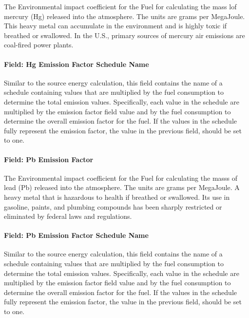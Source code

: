 The Environmental impact coefficient for the Fuel for calculating the mass lof mercury (Hg) released into the atmosphere. The units are grams per MegaJoule. This heavy metal can accumulate in the environment and is highly toxic if breathed or swallowed. In the U.S., primary sources of mercury air emissions are coal-fired power plants.

\paragraph{Field: Hg Emission Factor Schedule Name}\label{field-hg-emission-factor-schedule-name}

Similar to the source energy calculation, this field contains the name of a schedule containing values that are multiplied by the fuel consumption to determine the total emission values. Specifically, each value in the schedule are multiplied by the emission factor field value and by the fuel consumption to determine the overall emission factor for the fuel. If the values in the schedule fully represent the emission factor, the value in the previous field, should be set to one.

\paragraph{Field: Pb Emission Factor}\label{field-pb-emission-factor}

The Environmental impact coefficient for the Fuel for calculating the masss of lead (Pb) released into the atmosphere. The units are grams per MegaJoule. A heavy metal that is hazardous to health if breathed or swallowed. Its use in gasoline, paints, and plumbing compounds has been sharply restricted or eliminated by federal laws and regulations.

\paragraph{Field: Pb Emission Factor Schedule Name}\label{field-pb-emission-factor-schedule-name}

Similar to the source energy calculation, this field contains the name of a schedule containing values that are multiplied by the fuel consumption to determine the total emission values. Specifically, each value in the schedule are multiplied by the emission factor field value and by the fuel consumption to determine the overall emission factor for the fuel. If the values in the schedule fully represent the emission factor, the value in the previous field, should be set to one.

